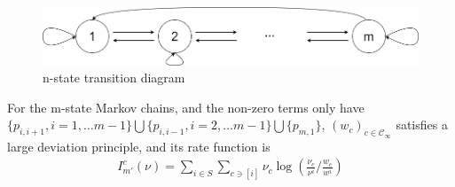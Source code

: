 \documentclass[11pt,en,cite=authoryear]{elegantpaper}
\begin{document}
\begin{figure}[h]
    \centering
    \includegraphics[scale=0.3]{n-state.png}
    \caption{n-state transition diagram}
\end{figure}
\begin{theorem}
    For the m-state Markov chains, and the non-zero terms only have $\{p_{i, i+1}, i=1, \dots m-1\} \bigcup \{p_{i, i-1}, i=2, \dots m-1\} \bigcup \{p_{m,1}\}$, $(w_{c})_{c \in \mathcal{C}_{\infty}}$ satisfies a large deviation principle, and its rate function is
    \begin{align*}
        I_{m'}^{c}(\nu) = \sum_{i \in S} \sum_{c \ni [i]} \nu_c \log \left(\frac{\nu_c}{\nu^i} /\frac{w_c}{w^i}\right)
    \end{align*}
\end{theorem}
\end{document}
